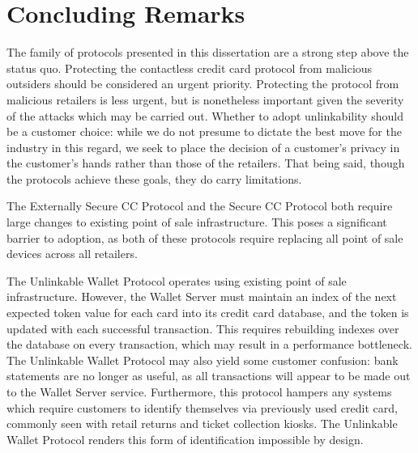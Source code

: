 \section{Concluding Remarks}

The family of protocols presented in this dissertation are a strong step above the status quo.
Protecting the contactless credit card protocol from malicious outsiders should be considered an urgent priority.
Protecting the protocol from malicious retailers is less urgent, but is nonetheless important given the severity of the attacks which may be carried out.
Whether to adopt unlinkability should be a customer choice:
    while we do not presume to dictate the best move for the industry in this regard,
    we seek to place the decision of a customer's privacy in the customer's hands rather than those of the retailers.
That being said, though the protocols achieve these goals, they do carry limitations.

The Externally Secure CC Protocol and the Secure CC Protocol both require large changes to existing point of sale infrastructure.
This poses a significant barrier to adoption, as both of these protocols require replacing all point of sale devices across all retailers.

The Unlinkable Wallet Protocol operates using existing point of sale infrastructure.
However, the Wallet Server must maintain an index of the next expected token value for each card into its credit card database,
    and the token is updated with each successful transaction.
This requires rebuilding indexes over the database on every transaction, which may result in a performance bottleneck.
The Unlinkable Wallet Protocol may also yield some customer confusion:
    bank statements are no longer as useful, as all transactions will appear to be made out to the Wallet Server service.
Furthermore, this protocol hampers any systems which require customers to identify themselves via previously used credit card,
    commonly seen with retail returns and ticket collection kiosks.
The Unlinkable Wallet Protocol renders this form of identification impossible by design.
